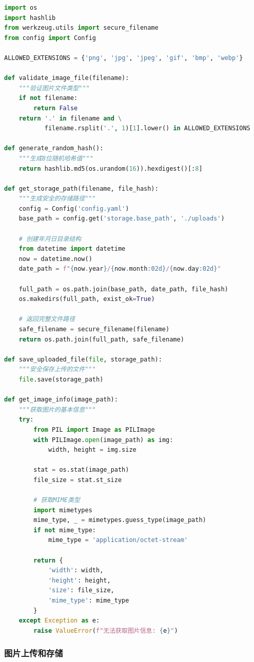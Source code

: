 \documentclass[cs4size,a4paper]{ctexart}
\numberwithin{equation}{section}
\numberwithin{table}{section}
\numberwithin{figure}{section}
\begin{document}
\begin{lstlisting}[language=Python,caption=文件处理工具函数]
import os
import hashlib
from werkzeug.utils import secure_filename
from config import Config

ALLOWED_EXTENSIONS = {'png', 'jpg', 'jpeg', 'gif', 'bmp', 'webp'}

def validate_image_file(filename):
    """验证图片文件类型"""
    if not filename:
        return False
    return '.' in filename and \
           filename.rsplit('.', 1)[1].lower() in ALLOWED_EXTENSIONS

def generate_random_hash():
    """生成8位随机哈希值"""
    return hashlib.md5(os.urandom(16)).hexdigest()[:8]

def get_storage_path(filename, file_hash):
    """生成安全的存储路径"""
    config = Config('config.yaml')
    base_path = config.get('storage.base_path', './uploads')

    # 创建年月日目录结构
    from datetime import datetime
    now = datetime.now()
    date_path = f"{now.year}/{now.month:02d}/{now.day:02d}"

    full_path = os.path.join(base_path, date_path, file_hash)
    os.makedirs(full_path, exist_ok=True)

    # 返回完整文件路径
    safe_filename = secure_filename(filename)
    return os.path.join(full_path, safe_filename)

def save_uploaded_file(file, storage_path):
    """安全保存上传的文件"""
    file.save(storage_path)

def get_image_info(image_path):
    """获取图片的基本信息"""
    try:
        from PIL import Image as PILImage
        with PILImage.open(image_path) as img:
            width, height = img.size

        stat = os.stat(image_path)
        file_size = stat.st_size

        # 获取MIME类型
        import mimetypes
        mime_type, _ = mimetypes.guess_type(image_path)
        if not mime_type:
            mime_type = 'application/octet-stream'

        return {
            'width': width,
            'height': height,
            'size': file_size,
            'mime_type': mime_type
        }
    except Exception as e:
        raise ValueError(f"无法获取图片信息: {e}")
\end{lstlisting}

\subsubsection{图片上传和存储}
\end{document}
